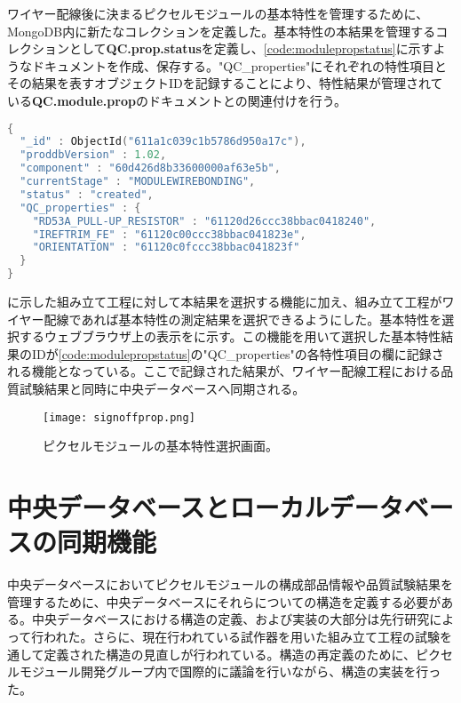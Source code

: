 ワイヤー配線後に決まるピクセルモジュールの基本特性を管理するために、MongoDB内に新たなコレクションを定義した。基本特性の本結果を管理するコレクションとして\textbf{QC.prop.status}を定義し、\cref{code:modulepropstatus}に示すようなドキュメントを作成、保存する。"QC\_properties"にそれぞれの特性項目とその結果を表すオブジェクトIDを記録することにより、特性結果が管理されている\textbf{QC.module.prop}のドキュメントとの関連付けを行う。


\begin{lstlisting}[caption=ピクセルモジュールの組み立て工程を管理するためのドキュメントの一部。,label=code:modulepropstatus, language=C++]
{
  "_id" : ObjectId("611a1c039c1b5786d950a17c"),
  "proddbVersion" : 1.02,
  "component" : "60d426d8b33600000af63e5b",
  "currentStage" : "MODULEWIREBONDING",
  "status" : "created",
  "QC_properties" : {
    "RD53A_PULL-UP_RESISTOR" : "61120d26ccc38bbac0418240",
    "IREFTRIM_FE" : "61120c00ccc38bbac041823e",
    "ORIENTATION" : "61120c0fccc38bbac041823f"
  }
}
\end{lstlisting}

に示した組み立て工程に対して本結果を選択する機能に加え、組み立て工程がワイヤー配線であれば基本特性の測定結果を選択できるようにした。基本特性を選択するウェブブラウザ上の表示をに示す。この機能を用いて選択した基本特性結果のIDが\cref{code:modulepropstatus}の"QC\_properties"の各特性項目の欄に記録される機能となっている。ここで記録された結果が、ワイヤー配線工程における品質試験結果と同時に中央データベースへ同期される。

\begin{figure}[tbp]
  \centering
  \texttt{[image: signoffprop.png]}
  \caption[ピクセルモジュールの基本特性選択画面]{ピクセルモジュールの基本特性選択画面。}
  \label{fig:sign-off-prop}
\end{figure}

\section{中央データベースとローカルデータベースの同期機能}
\label{sec:douki}

中央データベースにおいてピクセルモジュールの構成部品情報や品質試験結果を管理するために、中央データベースにそれらについての構造を定義する必要がある。中央データベースにおける構造の定義、および実装の大部分は先行研究\cite{oku}によって行われた。さらに、現在行われている試作器を用いた組み立て工程の試験を通して定義された構造の見直しが行われている。構造の再定義のために、ピクセルモジュール開発グループ内で国際的に議論を行いながら、構造の実装を行った。


